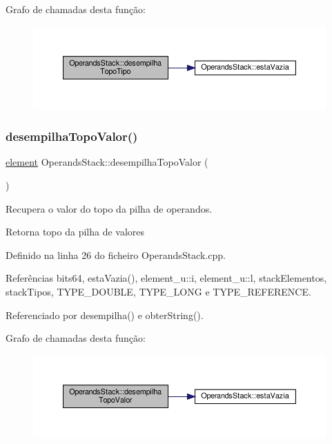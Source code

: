 Grafo de chamadas desta função\+:
\nopagebreak
\begin{figure}[H]
\begin{center}
\leavevmode
\includegraphics[width=350pt]{classOperandsStack_a8c76f12ad6984b3c5b4ec8807eb63ae3_cgraph}
\end{center}
\end{figure}
\mbox{\label{classOperandsStack_a184a99d160e17ef874a7b83f0726fb8a}} 
\subsubsection{\texorpdfstring{desempilha\+Topo\+Valor()}{desempilhaTopoValor()}}
{\footnotesize\ttfamily \hyperlink{unionelement}{element} Operands\+Stack\+::desempilha\+Topo\+Valor (\begin{DoxyParamCaption}{ }\end{DoxyParamCaption})}



Recupera o valor do topo da pilha de operandos. 

Retorna topo da pilha de valores 

Definido na linha 26 do ficheiro Operands\+Stack.\+cpp.



Referências bits64, esta\+Vazia(), element\+\_\+u\+::i, element\+\_\+u\+::l, stack\+Elementos, stack\+Tipos, T\+Y\+P\+E\+\_\+\+D\+O\+U\+B\+LE, T\+Y\+P\+E\+\_\+\+L\+O\+NG e T\+Y\+P\+E\+\_\+\+R\+E\+F\+E\+R\+E\+N\+CE.



Referenciado por desempilha() e obter\+String().

Grafo de chamadas desta função\+:
\nopagebreak
\begin{figure}[H]
\begin{center}
\leavevmode
\includegraphics[width=350pt]{classOperandsStack_a184a99d160e17ef874a7b83f0726fb8a_cgraph}
\end{center}
\end{figure}
\mbox{\label{classOperandsStack_a9503313a7def4c11fb782d5881e3d6cb}} 
